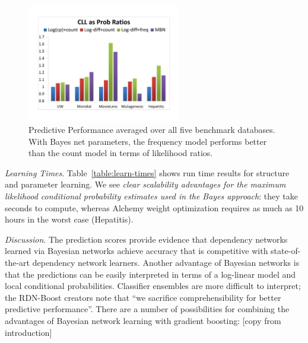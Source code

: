 \documentclass[runningheads,a4paper]{llncs}
\newcommand{\fixneeded}[1]{\textbf{[\footnotesize #1]}}
\newcommand{\point}[1]{\noindent\emph{#1}.}
\newcommand{\keypoint}[1]{{\em #1}}
\begin{document}
\begin{figure}[htbp]

\begin{center}
\includegraphics[width=0.6\textwidth]{CLL_Prob_Ratios_New}
\caption{Predictive Performance averaged over all five benchmark databases. With Bayes net parameters, the frequency model performs better than the count model in terms of likelihood ratios. 
}
\label{fig:summarize}
\end{center}
\end{figure}

\point{Learning Times}
Table~\ref{table:learn-times} shows run time results for structure and parameter learning. We see \keypoint{clear scalability advantages for the maximum likelihood conditional probability estimates used in the Bayes approach}: they take seconds to compute, whereas Alchemy weight optimization requires as much as 10 hours in the worst case (Hepatitis). 



\point{Discussion} The prediction scores provide evidence that dependency networks learned via Bayesian networks achieve accuracy that is competitive with state-of-the-art dependency network learners. Another advantage of Bayesian networks is that the predictions can be easily interpreted in terms of a log-linear model and local conditional probabilities. Classifier ensembles are more difficult to interpret; the RDN-Boost creators note that ``we sacrifice comprehensibility for better predictive performance''. There are a number of possibilities for combining the advantages of Bayesian network learning with gradient boosting: [copy from introduction]
\end{document}
